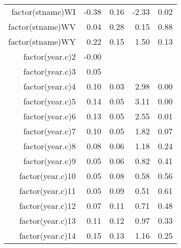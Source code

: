 \begin{table}[ht]
\begin{tabular}{rrrrr}
  factor(stname)WI & -0.38 & 0.16 & -2.33 & 0.02 \\ 
  factor(stname)WV & 0.04 & 0.28 & 0.15 & 0.88 \\ 
  factor(stname)WY & 0.22 & 0.15 & 1.50 & 0.13 \\ 
  factor(year.c)2 & -0.00 &  &  &  \\ 
  factor(year.c)3 & 0.05 &  &  &  \\ 
  factor(year.c)4 & 0.10 & 0.03 & 2.98 & 0.00 \\ 
  factor(year.c)5 & 0.14 & 0.05 & 3.11 & 0.00 \\ 
  factor(year.c)6 & 0.13 & 0.05 & 2.55 & 0.01 \\ 
  factor(year.c)7 & 0.10 & 0.05 & 1.82 & 0.07 \\ 
  factor(year.c)8 & 0.08 & 0.06 & 1.18 & 0.24 \\ 
  factor(year.c)9 & 0.05 & 0.06 & 0.82 & 0.41 \\ 
  factor(year.c)10 & 0.05 & 0.08 & 0.58 & 0.56 \\ 
  factor(year.c)11 & 0.05 & 0.09 & 0.51 & 0.61 \\ 
  factor(year.c)12 & 0.07 & 0.11 & 0.71 & 0.48 \\ 
  factor(year.c)13 & 0.11 & 0.12 & 0.97 & 0.33 \\ 
  factor(year.c)14 & 0.15 & 0.13 & 1.16 & 0.25 \\ 
   \hline
\end{tabular}
\end{table}
